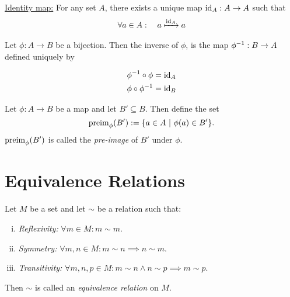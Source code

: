 
\noindent \uline{Identity map:} For any set \(A\), there exists a unique map \(\operatorname{id}_A: A \to A\) such that
\begin{align*}
	\forall a \in A: \quad a \xmapsto{\operatorname{id}_A} a
\end{align*}

\begin{definition}
	Let \(\phi: A \to B\) be a bijection. Then the inverse of \(\phi\), is the map \(\phi^{-1}: B \to A\) defined uniquely by
	\begin{minipage}{0.4\textwidth}
		\begin{figure}[H]
			\centering
			\label{fig:inverse_of_map}
		\end{figure}
	\end{minipage}\hfill
	\begin{minipage}{0.6\textwidth}
		\begin{equation}
			\begin{aligned}
				\phi^{-1} \circ \phi & = \operatorname{id}_A \\
				\phi \circ \phi^{-1} & = \operatorname{id}_B
			\end{aligned}
		\end{equation}
	\end{minipage}
\end{definition}

\begin{definition}
	Let \(\phi: A \to B\) be a map and let \(B' \subseteq B\). Then define the set
	\begin{equation}
		\operatorname{preim}_{\phi}(B') := \qty{a \in A \ \middle|\ \phi(a) \in B'}.
	\end{equation}
	\(\operatorname{preim}_{\phi}(B')\) is called the \emph{pre-image} of \(B'\) under \(\phi\).
\end{definition}

\section{Equivalence Relations}

\begin{definition}
	Let \(M\) be a set and let \(\sim\) be a relation such that:
	\begin{enumerate}[(i)]
		\item \emph{Reflexivity:} \(\forall m \in M: m \sim m\).
		\item \emph{Symmetry:} \(\forall m, n \in M: m \sim n \implies n \sim m\).
		\item \emph{Transitivity:} \(\forall m, n, p \in M: m \sim n \land n \sim p \implies m \sim p\).
	\end{enumerate}
	Then \(\sim\) is called an \emph{equivalence relation} on \(M\).
\end{definition}

